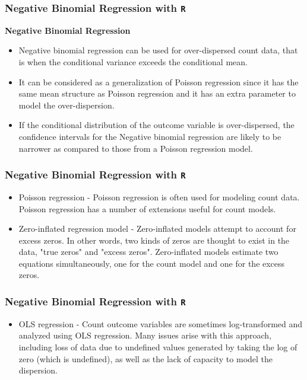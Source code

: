 \documentclass[00-GLMregslides.tex]{subfiles}
\begin{document}
\begin{frame}[fragile]
	\frametitle{Negative Binomial Regression with \texttt{R} }
	\Large
\textbf{Negative Binomial Regression}	
	\begin{itemize}
	\item Negative binomial regression can be used for over-dispersed count data, that is when the conditional variance exceeds the conditional mean.
	\item It can be considered as a generalization of Poisson regression since it has the same mean structure as Poisson regression and it has an extra parameter to model the over-dispersion. 
	\item If the conditional distribution of the outcome variable is over-dispersed, the confidence intervals for the Negative binomial regression are likely to be narrower as compared to those from a Poisson regression model.
	\end{itemize}
	
\end{frame}
\begin{frame}[fragile]
	\frametitle{Negative Binomial Regression with \texttt{R} }
	\Large
	\begin{itemize}
	\item Poisson regression - Poisson regression is often used for modeling count data. Poisson regression has a number of extensions useful for count models.
 \item	Zero-inflated regression model - Zero-inflated models attempt to account for excess zeros. In other words, two kinds of zeros are thought to exist in the data, "true zeros" and "excess zeros". Zero-inflated models estimate two equations simultaneously, one for the count model and one for the excess zeros.
\end{itemize}
\end{frame}
\begin{frame}[fragile]
	\frametitle{Negative Binomial Regression with \texttt{R} }
	\Large
	\begin{itemize}
	\item 	
	OLS regression - Count outcome variables are sometimes log-transformed and analyzed using OLS regression. Many issues arise with this approach, including loss of data due to undefined values generated by taking the log of zero (which is undefined), as well as the lack of capacity to model the dispersion.
\end{itemize}
\end{frame}
\end{document}
